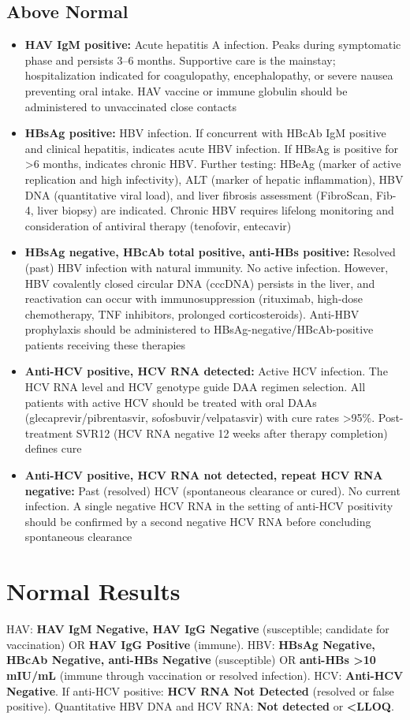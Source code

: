 \subsection*{Above Normal}
\begin{itemize}
  \item \textbf{HAV IgM positive:} Acute hepatitis A infection. Peaks during symptomatic phase and persists 3--6 months. Supportive care is the mainstay; hospitalization indicated for coagulopathy, encephalopathy, or severe nausea preventing oral intake. HAV vaccine or immune globulin should be administered to unvaccinated close contacts
  \item \textbf{HBsAg positive:} HBV infection. If concurrent with HBcAb IgM positive and clinical hepatitis, indicates acute HBV infection. If HBsAg is positive for >6 months, indicates chronic HBV. Further testing: HBeAg (marker of active replication and high infectivity), ALT (marker of hepatic inflammation), HBV DNA (quantitative viral load), and liver fibrosis assessment (FibroScan, Fib-4, liver biopsy) are indicated. Chronic HBV requires lifelong monitoring and consideration of antiviral therapy (tenofovir, entecavir)
  \item \textbf{HBsAg negative, HBcAb total positive, anti-HBs positive:} Resolved (past) HBV infection with natural immunity. No active infection. However, HBV covalently closed circular DNA (cccDNA) persists in the liver, and reactivation can occur with immunosuppression (rituximab, high-dose chemotherapy, TNF inhibitors, prolonged corticosteroids). Anti-HBV prophylaxis should be administered to HBsAg-negative/HBcAb-positive patients receiving these therapies
  \item \textbf{Anti-HCV positive, HCV RNA detected:} Active HCV infection. The HCV RNA level and HCV genotype guide DAA regimen selection. All patients with active HCV should be treated with oral DAAs (glecaprevir/pibrentasvir, sofosbuvir/velpatasvir) with cure rates >95\%. Post-treatment SVR12 (HCV RNA negative 12 weeks after therapy completion) defines cure
  \item \textbf{Anti-HCV positive, HCV RNA not detected, repeat HCV RNA negative:} Past (resolved) HCV (spontaneous clearance or cured). No current infection. A single negative HCV RNA in the setting of anti-HCV positivity should be confirmed by a second negative HCV RNA before concluding spontaneous clearance
\end{itemize}

\section*{Normal Results}
HAV: \textbf{HAV IgM Negative, HAV IgG Negative} (susceptible; candidate for vaccination) OR \textbf{HAV IgG Positive} (immune). HBV: \textbf{HBsAg Negative, HBcAb Negative, anti-HBs Negative} (susceptible) OR \textbf{anti-HBs >10 mIU/mL} (immune through vaccination or resolved infection). HCV: \textbf{Anti-HCV Negative}. If anti-HCV positive: \textbf{HCV RNA Not Detected} (resolved or false positive). Quantitative HBV DNA and HCV RNA: \textbf{Not detected} or \textbf{<LLOQ}.

